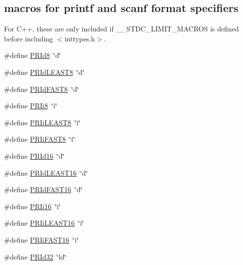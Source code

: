 \subsection*{macros for printf and scanf format specifiers}
\label{_amgrp308366f5f1be938cc93967ed6dbe20e9}%
For C++, these are only included if \+\_\+\+\_\+\+S\+T\+D\+C\+\_\+\+L\+I\+M\+I\+T\+\_\+\+M\+A\+C\+R\+OS is defined before including $<$inttypes.\+h$>$. \begin{DoxyCompactItemize}
\item 
\#define \hyperlink{group__avr__inttypes_gae53c45f590033ad1f2f517faf3ab2f1b}{P\+R\+Id8}~\char`\"{}d\char`\"{}
\item 
\#define \hyperlink{group__avr__inttypes_ga404fd01f0b890cb8fac8641aaa704b57}{P\+R\+Id\+L\+E\+A\+S\+T8}~\char`\"{}d\char`\"{}
\item 
\#define \hyperlink{group__avr__inttypes_ga943961b7e7e564388dd743593db5bbbb}{P\+R\+Id\+F\+A\+S\+T8}~\char`\"{}d\char`\"{}
\item 
\#define \hyperlink{group__avr__inttypes_gadbe02b78cca747b2fe1a8f7fc5f5cd47}{P\+R\+Ii8}~\char`\"{}i\char`\"{}
\item 
\#define \hyperlink{group__avr__inttypes_ga526151b1725956030b501d9dd506f2e1}{P\+R\+Ii\+L\+E\+A\+S\+T8}~\char`\"{}i\char`\"{}
\item 
\#define \hyperlink{group__avr__inttypes_ga64fb4e44c3ff09179fc445979b7fdad1}{P\+R\+Ii\+F\+A\+S\+T8}~\char`\"{}i\char`\"{}
\item 
\#define \hyperlink{group__avr__inttypes_ga087e50fe0283aacc71d7138d13e91939}{P\+R\+Id16}~\char`\"{}d\char`\"{}
\item 
\#define \hyperlink{group__avr__inttypes_gae90ab00cb4417081dc68e9fd6c0e129a}{P\+R\+Id\+L\+E\+A\+S\+T16}~\char`\"{}d\char`\"{}
\item 
\#define \hyperlink{group__avr__inttypes_ga58cdfb02574b8c23d964a6e88a268782}{P\+R\+Id\+F\+A\+S\+T16}~\char`\"{}d\char`\"{}
\item 
\#define \hyperlink{group__avr__inttypes_ga655e9b358e0371a4bf5ff21cc08273e3}{P\+R\+Ii16}~\char`\"{}i\char`\"{}
\item 
\#define \hyperlink{group__avr__inttypes_ga96945864cb2d1f7de861ccaf639af02e}{P\+R\+Ii\+L\+E\+A\+S\+T16}~\char`\"{}i\char`\"{}
\item 
\#define \hyperlink{group__avr__inttypes_gac273fb2a05215962fbeae76abaaf0131}{P\+R\+Ii\+F\+A\+S\+T16}~\char`\"{}i\char`\"{}
\item 
\#define \hyperlink{group__avr__inttypes_ga6d94d1417e1b35c53aee6306590de72b}{P\+R\+Id32}~\char`\"{}ld\char`\"{}

\end{DoxyCompactItemize}
